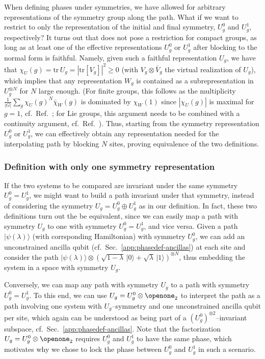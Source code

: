 \documentclass[twocolumn,superscriptaddress,prb,linenumbers]{revtex4-1}
\newcommand{\ket}[1]{\vert#1\rangle}
\newcommand{\tr}{\mathrm{tr}}
\begin{document}
When defining phases under symmetries, we have allowed for arbitrary
representations of the symmetry group along the path. What if we want to
restrict to only the representation of the initial and final symmetry,
$U_g^0$ and $U_g^1$, respectively? It turns out that does not pose a
restriction for compact groups, as long as at least one of the effective
representations $U_g^0$ or $U_g^1$ after blocking to the normal form is
faithful.  Namely, given such a faithful representation $U_g$, we have
that $\chi_U(g)=\tr\,U_g = |\tr[V_g]|^2\ge0$ (with $V_g\otimes\bar V_g$
the virtual realization of $U_g$), which implies that any representation
$W_g$ is contained as a subrepresentation in $U_g^{\otimes N}$ for $N$
large enough. (For finite groups, this follows as the multiplicity
$\tfrac{1}{|G|}\sum_g \chi_U(g)^N\bar\chi_W(g)$ is dominated by
$\chi_W(1)$ since $|\chi_U(g)|$ is maximal for $g=1$,
cf.~Ref.~; for Lie groups, this argument needs
to be combined with a continuity argument,
cf.~Ref.~). Thus, starting from the
symmetry representation $U_g^0$ or $U_g^1$, we can effectively obtain any
representation needed for the interpolating path by blocking $N$ sites,
proving equivalence of the two definitions.




\subsubsection{Definition with only one symmetry representation}


If the two systems to be compared are invariant under the same symmetry
$U_g^0=U_g^1$, we might want to build a path invariant under that
symmetry, instead of considering the symmetry $U_g=U_g^0\oplus U_g^1$ as
in our definition. In fact, these two definitions turn out the be
equivalent, since we can easily map a path with symmetry $U_g$ to one with
symmetry $U_g^0=U_g^1$, and vice versa.  Given a path
$\ket{\psi(\lambda)}$ (with corrsponding Hamiltonian) with symmetry
$U_g^0$, we can add an unconstrained ancilla qubit
(cf.~Sec.~\ref{app:phasedef-ancillas}) at each site and consider the path
$\ket{\psi(\lambda)} \otimes(\sqrt{1-\lambda}\,\ket0+
    \sqrt{\lambda}\,\ket{1})^{\otimes
        N}$, thus embedding the system in a space with symmetry $U_g$.


Conversely, we can map any path with symmetry $U_g$ to a path with
symmetry $U_g^0=U_g^1$. To this end, we can use $U_g = U_g^0\otimes
    \openone_2$ to interpret the path as a path involving one system with
$U_g$--symmetry and one unconstrained ancilla qubit per site, which again
can be understood as being part of a $(U_g^0)^{\otimes 2}$--invariant
subspace, cf.~Sec.~\ref{app:phasedef-ancillas}. Note that the
factorization $U_g=U_g^0\otimes \openone_2$ requires
$U_g^0$ and $U_g^1$ to have the same phase, which motivates why we chose
to lock the phase between $U_g^0$ and $U_g^1$ in such a scenario.
\end{document}
